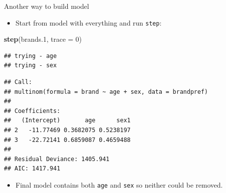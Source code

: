 \documentclass[ignorenonframetext,]{beamer}
\newenvironment{Shaded}{\begin{snugshade}}{\end{snugshade}}
\newcommand{\DataTypeTok}[1]{\textcolor[rgb]{0.13,0.29,0.53}{#1}}
\newcommand{\DecValTok}[1]{\textcolor[rgb]{0.00,0.00,0.81}{#1}}
\newcommand{\FloatTok}[1]{\textcolor[rgb]{0.00,0.00,0.81}{#1}}
\newcommand{\KeywordTok}[1]{\textcolor[rgb]{0.13,0.29,0.53}{\textbf{#1}}}
\newcommand{\NormalTok}[1]{#1}
\providecommand{\tightlist}{%
  \setlength{\itemsep}{0pt}\setlength{\parskip}{0pt}}
\begin{document}
\begin{frame}[fragile]{Another way to build model}
\protect\hypertarget{another-way-to-build-model}{}

\begin{itemize}
\tightlist
\item
  Start from model with everything and run \texttt{step}:
\end{itemize}

\footnotesize

\begin{Shaded}
\begin{Highlighting}[]
\KeywordTok{step}\NormalTok{(brands}\FloatTok{.1}\NormalTok{, }\DataTypeTok{trace =} \DecValTok{0}\NormalTok{)}
\end{Highlighting}
\end{Shaded}

\begin{verbatim}
## trying - age 
## trying - sex
\end{verbatim}

\begin{verbatim}
## Call:
## multinom(formula = brand ~ age + sex, data = brandpref)
## 
## Coefficients:
##   (Intercept)       age      sex1
## 2   -11.77469 0.3682075 0.5238197
## 3   -22.72141 0.6859087 0.4659488
## 
## Residual Deviance: 1405.941 
## AIC: 1417.941
\end{verbatim}

\normalsize

\begin{itemize}
\tightlist
\item
  Final model contains both \texttt{age} and \texttt{sex} so neither
  could be removed.
\end{itemize}

\end{frame}
\end{document}
